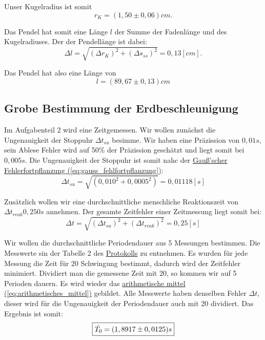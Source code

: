 Unser Kugelradius ist somit 
\begin{equation}
    \boxed{
        r_K = (1,50 \pm 0,06)cm.
    }
\end{equation}

Das Pendel hat somit eine Länge $l$ der Summe der Fadenlänge und des Kugelradiuses. Der der Pendellänge ist dabei:
\begin{equation}
    \Delta l = \sqrt{(\Delta r_K)^2 + (\Delta s_{ss})^2} = 0,13 [cm].
\end{equation} 

Das Pendel hat also eine Länge von
\begin{equation}
\boxed{
    l = (89,67 \pm 0,13)cm
}
\end{equation}


\subsection*{Grobe Bestimmung der Erdbeschleunigung}
Im Aufgabenteil 2 wird eine Zeitgemessen. Wir wollen zunächst die Ungenauigkeit der Stoppuhr $\Delta t_{su}$ besimme. Wir haben eine Präzission von $0,01s$, sein Ablese Fehler wird auf 50\% der Präzission geschätzt und liegt somit bei $0,005s$. Die Ungenauigkeit der Stoppuhr ist somit nahc der \hyperref[eq:gauss_fehlfortpflanzung]{Gauß'scher Fehlerfortpflanzung (\ref*{eq:gauss_fehlfortpflanzung})}:
\begin{equation}
    \Delta t_{su} = \sqrt{(0,010^2 + 0,0005^2)} = 0,01118 [s]
\end{equation}

Zusätzlich wollen wir eine durchschnittliche menschliche Reaktionszeit von $\Delta t_{reak} 0,250s$ annehmen. Der gesamte Zeitfehler einer Zeitmessung liegt somit bei:
\begin{equation}
    \Delta t = \sqrt{(\Delta t_{su})^2+ (\Delta t_{reak})^2} = 0,25 [s]
\end{equation}

Wir wollen die durchschnittliche Periodendauer aus 5 Messungen bestimmen. Die Messwerte sin der Tabelle 2 des \hyperref[Protokoll]{Protokolls} zu entnehmen. Es wurden für jede Messung die Zeit für 20 Schwingung bestimmt, dadurch wird der Zeitfehler minimiert. Dividiert man die gemessene Zeit mit $20$, so kommen wir auf 5 Perioden dauern. Es wird wieder das \hyperref[eq:arithmetisches_mittel]{arithmetische mittel (\ref*{eq:arithmetisches_mittel})} gebildet. Alle Messwerte haben denselben Fehler $\Delta t$, dieser wird für die Ungenauigkeit der Periodendauer auch mit 20 dividiert. Das Ergebnis ist somit:
\begin{equation}
    \boxed{
        \Bar{T_0} = (1,8917 \pm 0,0125)s
    }
\end{equation}

